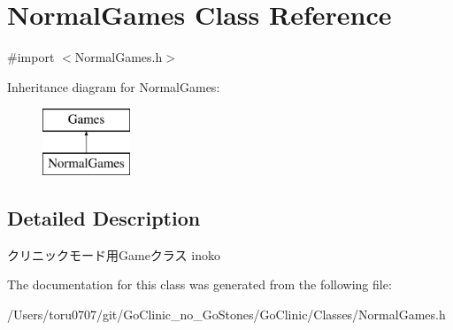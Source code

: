\hypertarget{interface_normal_games}{
\section{NormalGames Class Reference}
\label{interface_normal_games}
}


{\ttfamily \#import $<$NormalGames.h$>$}

Inheritance diagram for NormalGames:\begin{figure}[H]
\begin{center}
\leavevmode
\includegraphics[height=2.000000cm]{interface_normal_games}
\end{center}
\end{figure}


\subsection{Detailed Description}
クリニックモード用Gameクラス  inoko 

The documentation for this class was generated from the following file:\begin{DoxyCompactItemize}
\item 
/Users/toru0707/git/GoClinic\_\-no\_\-GoStones/GoClinic/Classes/NormalGames.h\end{DoxyCompactItemize}
